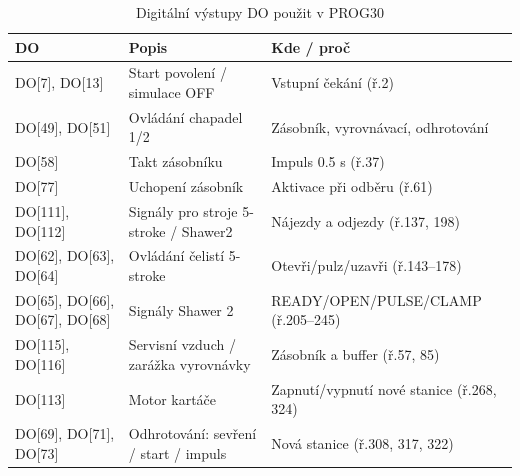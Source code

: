 \begin{table}[H]
  \centering
  \caption{Digitální výstupy DO použit v PROG30}
  \begin{tabular}{lll}
    \toprule
    DO & Popis & Kde / proč \\
    \midrule
    DO[7], DO[13] & Start povolení / simulace OFF & Vstupní čekání (ř.2) \\
    DO[49], DO[51] & Ovládání chapadel 1/2 & Zásobník, vyrovnávací, odhrotování \\
    DO[58] & Takt zásobníku & Impuls 0.5 s (ř.37) \\
    DO[77] & Uchopení zásobník & Aktivace při odběru (ř.61) \\
    DO[111], DO[112] & Signály pro stroje 5-stroke / Shawer2 & Nájezdy a odjezdy (ř.137, 198) \\
    DO[62], DO[63], DO[64] & Ovládání čelistí 5-stroke & Otevři/pulz/uzavři (ř.143–178) \\
    DO[65], DO[66], DO[67], DO[68] & Signály Shawer 2 & READY/OPEN/PULSE/CLAMP (ř.205–245) \\
    DO[115], DO[116] & Servisní vzduch / zarážka vyrovnávky & Zásobník a buffer (ř.57, 85) \\
    DO[113] & Motor kartáče & Zapnutí/vypnutí nové stanice (ř.268, 324) \\
    DO[69], DO[71], DO[73] & Odhrotování: sevření / start / impuls & Nová stanice (ř.308, 317, 322) \\
    \bottomrule
  \end{tabular}
\end{table}
